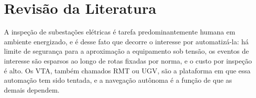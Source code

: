 \chapter{Revisão da Literatura}
\label{cap:revisao}

A inspeção de subestações elétricas é tarefa predominantemente humana em ambiente energizado, e é desse fato que decorre o interesse por automatizá-la: há limite de segurança para a aproximação a equipamento sob tensão, os eventos de interesse são esparsos ao longo de rotas fixadas por norma, e o custo por inspeção é alto. Os \ac{VTA}, também chamados \ac{RMT} ou \ac{UGV}, são a plataforma em que essa automação tem sido tentada, e a navegação autônoma é a função de que as demais dependem.

